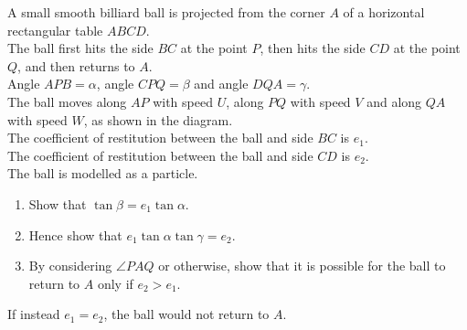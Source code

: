 \documentclass[leqno]{article}
\begin{document}
\begin{enumerate}[
  label=\textbf{\arabic*.},
  leftmargin=*,
  topsep=0pt,
  partopsep=0pt,
  parsep=0pt
]
\begin{figure}[H]
\end{figure}


A small smooth billiard ball is projected from the corner $A$ of a horizontal rectangular table $ABCD$. \\

The ball first hits the side $BC$ at the point $P$, then hits the side $CD$ at the point $Q$, and then returns to $A$. \\

Angle $APB=\alpha$, angle $CPQ=\beta$ and angle $DQA=\gamma$. \\

The ball moves along $AP$ with speed $U$, along $PQ$ with speed $V$ and along $QA$ with speed $W$, as shown in the diagram. \\

The coefficient of restitution between the ball and side $BC$ is $e_1$. \\

The coefficient of restitution between the ball and side $CD$ is $e_2$. \\

The ball is modelled as a particle. \\

\begin{enumerate}[label=\textbf{(\alph*)}]
  \item Show that $\tan\beta=e_1\tan\alpha$.  \\
  \item Hence show that $e_1\tan\alpha\tan\gamma=e_2$.  \\
  \item By considering $\angle PAQ$ or otherwise, show that it is possible for the ball to return to $A$ only if $e_2>e_1$.  \\
\end{enumerate}

If instead $e_1=e_2$, the ball would not return to $A$. \\


\end{enumerate}
\end{document}
